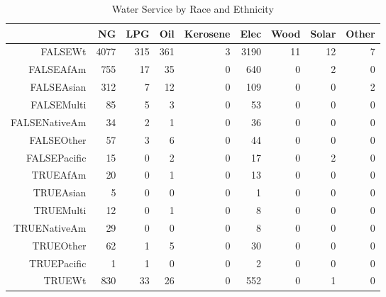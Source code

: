 \documentclass{article}
\begin{document}
\begin{table}[ht]
\centering
\begin{tabular}{rrrrrrrrr}
  \hline
 & NG & LPG & Oil & Kerosene & Elec & Wood & Solar & Other \\ 
  \hline
FALSEWt & 4077 & 315 & 361 &   3 & 3190 &  11 &  12 &   7 \\ 
  FALSEAfAm & 755 &  17 &  35 &   0 & 640 &   0 &   2 &   0 \\ 
  FALSEAsian & 312 &   7 &  12 &   0 & 109 &   0 &   0 &   2 \\ 
  FALSEMulti &  85 &   5 &   3 &   0 &  53 &   0 &   0 &   0 \\ 
  FALSENativeAm &  34 &   2 &   1 &   0 &  36 &   0 &   0 &   0 \\ 
  FALSEOther &  57 &   3 &   6 &   0 &  44 &   0 &   0 &   0 \\ 
  FALSEPacific &  15 &   0 &   2 &   0 &  17 &   0 &   2 &   0 \\ 
  TRUEAfAm &  20 &   0 &   1 &   0 &  13 &   0 &   0 &   0 \\ 
  TRUEAsian &   5 &   0 &   0 &   0 &   1 &   0 &   0 &   0 \\ 
  TRUEMulti &  12 &   0 &   1 &   0 &   8 &   0 &   0 &   0 \\ 
  TRUENativeAm &  29 &   0 &   0 &   0 &   8 &   0 &   0 &   0 \\ 
  TRUEOther &  62 &   1 &   5 &   0 &  30 &   0 &   0 &   0 \\ 
  TRUEPacific &   1 &   1 &   0 &   0 &   2 &   0 &   0 &   0 \\ 
  TRUEWt & 830 &  33 &  26 &   0 & 552 &   0 &   1 &   0 \\ 
   \hline
\end{tabular}
\caption{Water Service by Race and Ethnicity} 
\label{tab:Water}
\end{table}
\end{document}
